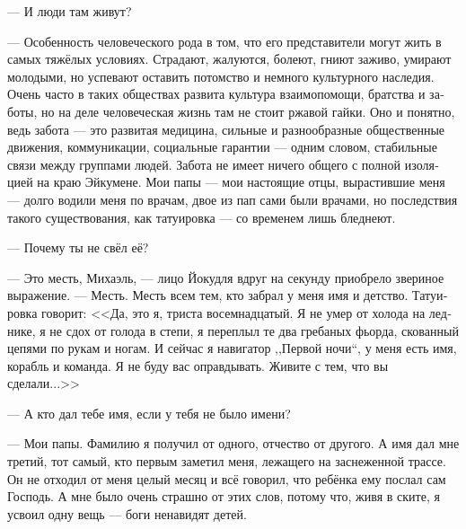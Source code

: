 \documentclass[a4paper,12pt,fleqn]{book}\usepackage{polyglossia}\setdefaultlanguage[babelshorthands=true]{russian}\setotherlanguage{english}\defaultfontfeatures{Ligatures=TeX,Mapping=tex-text}\usepackage{xcolor}\newcommand{\ml}[3]{#2}
\begin{document}
--- И люди там живут?

--- Особенность человеческого рода в том, что его представители могут жить в самых тяжёлых условиях.
Страдают, жалуются, болеют, гниют заживо, умирают молодыми, но успевают оставить потомство и немного культурного наследия.
\ml{$0$}
{Очень часто в таких обществах развита культура взаимопомощи, братства и заботы, но на деле человеческая жизнь там не стоит ржавой гайки.}
{Very often such a societies have strong culture of mutual aid, siblinghood, and care, but in fact human life costs cheaper than a rusty wingnut.}
\ml{$0$}
{Оно и понятно, ведь забота --- это развитая медицина, сильные и разнообразные общественные движения, коммуникации, социальные гарантии --- одним словом, стабильные связи между группами людей.}
{That's logical, 'cuz care is about advanced medical facilities, strong and various social movements, communications, social guarantees---in a nutshell, stable connections between human groups.}
\ml{$0$}
{Забота не имеет ничего общего с полной изоляцией на краю Эйкумене.}
{Care has nothing to do with complete isolation at the edge of Ökumene.}
Мои папы --- мои настоящие отцы, вырастившие меня --- долго водили меня по врачам, двое из пап сами были врачами, но последствия такого существования, как татуировка --- со временем лишь бледнеют.

--- Почему ты не свёл её?

--- Это месть, Михаэль, --- лицо Йокудля вдруг на секунду приобрело звериное выражение.
--- Месть.
Месть всем тем, кто забрал у меня имя и детство.
Татуировка говорит: <<Да, это я, триста восемнадцатый.
\ml{$0$}
{Я не умер от холода на леднике, я не сдох от голода в степи, я переплыл те два гребаных фьорда, скованный цепями по рукам и ногам.}
{I haven't frozen dead on the glacier, I haven't died of starvation on the grassland, I have crossed those two fucking fjorde with chains on my limbs.}
И сейчас я навигатор ,,Первой ночи``, у меня есть имя, корабль и команда.
\ml{$0$}
{Я не буду вас оправдывать.}
{I won't justify y'all.}
\ml{$0$}
{Живите с тем, что вы сделали...>>}
{Live with what you've done ....' ''}

--- А кто дал тебе имя, если у тебя не было имени?

--- Мои папы.
Фамилию я получил от одного, отчество от другого.
А имя дал мне третий, тот самый, кто первым заметил меня, лежащего на заснеженной трассе.
Он не отходил от меня целый месяц и всё говорил, что ребёнка ему послал сам Господь.
А мне было очень страшно от этих слов, потому что, живя в ските, я усвоил одну вещь --- боги ненавидят детей.
\end{document}
